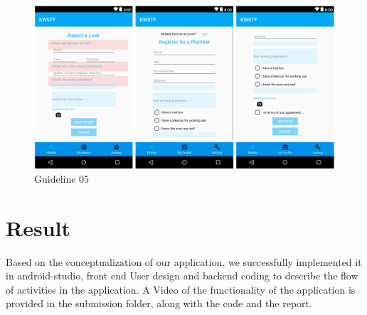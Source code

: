 \documentclass{article}
\begin{document}
\begin{figure}[H]
\centering
\includegraphics[width=15cm]{files/figures/fig1_guide5.png}
\caption{Guideline 05}

\end{figure} 

\section{Result}

Based on the conceptualization of our application, we successfully implemented it in android-studio, front end User design and backend coding to describe the flow of activities in the application. A Video of the functionality of the application is provided in the submission folder, along with the code and the report. 



 
\end{document}
